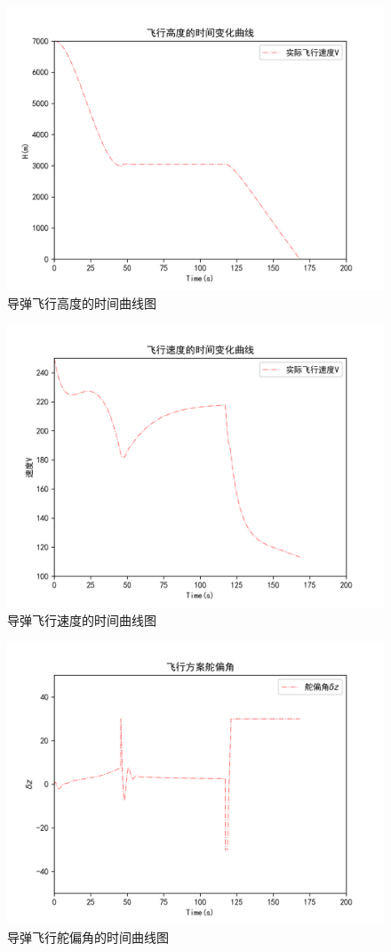 \documentclass[UTF8]{ctexart}
\begin{document}
\begin{figure}[H]
    \centering
    \includegraphics[width=130mm]{img/飞行高度.png}
    \caption{导弹飞行高度的时间曲线图}
\end{figure}
\begin{figure}[H]
    \centering
    \includegraphics[width=130mm]{img/飞行速度.png}
    \caption{导弹飞行速度的时间曲线图}
\end{figure}
\begin{figure}[H]
    \centering
    \includegraphics[width=130mm]{img/飞行舵偏角.png}
    \caption{导弹飞行舵偏角的时间曲线图}
\end{figure}
\end{document}
